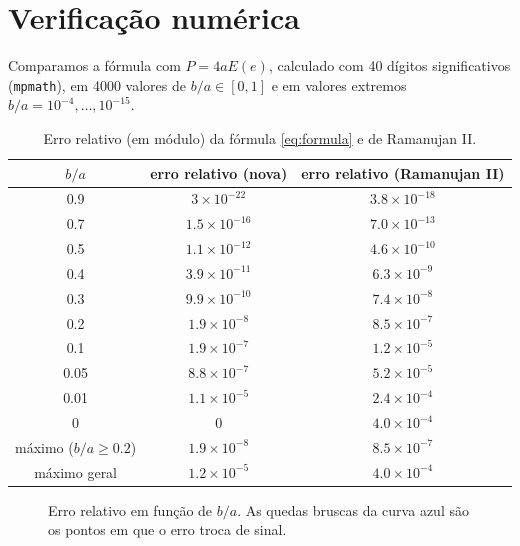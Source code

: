 \documentclass[11pt,a4paper]{article}
\theoremstyle{definition}
\theoremstyle{remark}
\begin{document}
\section{Verificação numérica}

Comparamos a fórmula com $P=4aE(e)$, calculado com 40 dígitos significativos
(\texttt{mpmath}), em 4000 valores de $b/a\in[0,1]$ e em valores extremos
$b/a=10^{-4},\dots,10^{-15}$.

\begin{table}[h]
\centering
\begin{tabular}{ccc}
\toprule
$b/a$ & erro relativo (nova) & erro relativo (Ramanujan II)\\
\midrule
0.9  & $3\times10^{-22}$ & $3.8\times10^{-18}$\\
0.7  & $1.5\times10^{-16}$ & $7.0\times10^{-13}$\\
0.5  & $1.1\times10^{-12}$ & $4.6\times10^{-10}$\\
0.4  & $3.9\times10^{-11}$ & $6.3\times10^{-9}$\\
0.3  & $9.9\times10^{-10}$ & $7.4\times10^{-8}$\\
0.2  & $1.9\times10^{-8}$ & $8.5\times10^{-7}$\\
0.1  & $1.9\times10^{-7}$ & $1.2\times10^{-5}$\\
0.05 & $8.8\times10^{-7}$ & $5.2\times10^{-5}$\\
0.01 & $1.1\times10^{-5}$ & $2.4\times10^{-4}$\\
0    & $0$ & $4.0\times10^{-4}$\\
\midrule
máximo ($b/a\ge0.2$) & $1.9\times10^{-8}$ & $8.5\times10^{-7}$\\
máximo geral & $1.2\times10^{-5}$ & $4.0\times10^{-4}$\\
\bottomrule
\end{tabular}
\caption{Erro relativo (em módulo) da fórmula \eqref{eq:formula} e de Ramanujan II.}
\end{table}

\begin{figure}[h]
\centering
{}
\caption{Erro relativo em função de $b/a$. As quedas bruscas da curva azul são os
pontos em que o erro troca de sinal.}
\end{figure}
\end{document}
